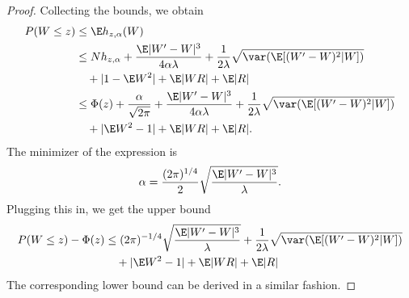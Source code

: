 \begin{proof}
  Collecting the bounds, we obtain
  \begin{equation}
    \begin{split}
      P(W \leq z) &\leq \E h_{z,\alpha}(W) \\
      &\leq Nh_{z,\alpha} + \frac{\E |W'-W|^3}{4 \alpha \lambda}
      + \frac{1}{2\lambda} \sqrt{\var (\E [(W'-W)^2|W])} \\
      &\quad + |1 - \E W^2| + \E |WR| + \E |R| \\
      &\leq \Phi (z) + \frac{\alpha}{\sqrt{2\pi}} + \frac{\E |W'-W|^3}{4 \alpha \lambda}
      + \frac{1}{2\lambda} \sqrt{\var (\E [(W'-W)^2|W])} \\
      &\quad + |\E W^2 - 1| + \E |WR| + \E |R|.
    \end{split}
  \end{equation}
  The minimizer of the expression is
  \begin{equation}
    \alpha = \frac{(2\pi)^{1/4}}{2}\sqrt{\frac{\E |W'-W|^3}{\lambda}}.
  \end{equation}
  Plugging this in, we get the upper bound
  \begin{equation}
    \begin{split}
      P(W \leq z) - \Phi(z) &\leq (2\pi)^{-1/4} \sqrt{\frac{\E |W'-W|^3}{\lambda}}
      + \frac{1}{2\lambda} \sqrt{\var (\E [(W'-W)^2|W])} \\
      &\quad + |\E W^2 - 1| + \E |WR| + \E |R|
    \end{split}
  \end{equation}
  The corresponding lower bound can be derived in a similar fashion.
\end{proof}

